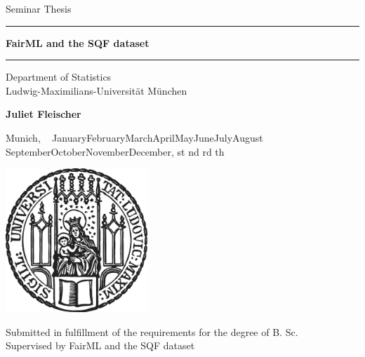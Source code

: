 \documentclass[12pt]{article}
\newcommand{\mytitle}{FairML and the SQF dataset}
\newcommand{\myname}{\large Juliet Fleischer}
\newcommand{\thesuffix}[1]{%
  \ifnum#1=1 st%
  \else\ifnum#1=2 nd%
  \else\ifnum#1=3 rd%
  \else th%
  \fi\fi\fi}
\newcommand{\mydate}{%
  ~\ifcase\month\or
  January\or February\or March\or April\or May\or June\or July\or August\or
  September\or October\or November\or December\fi, \the\day\thesuffix{\day} \number\year}
\begin{document}
 
\begin{titlepage}
\begin{center}
    
\LARGE
Seminar Thesis

\vspace{0.5cm}
      
\rule{\textwidth}{1.5pt}
\LARGE
\textbf{\mytitle}
\rule{\textwidth}{1.5pt}
   
\vspace{0.5cm}
      
\large
Department of Statistics \\
Ludwig-Maximilians-Universität München

\vfill

\Large
\textbf{\myname}

\vfill

\large

Munich, \mydate
      
\vfill

\includegraphics[width = 0.4\textwidth]{../figures/sigillum.png}

\vfill

\normalsize
Submitted in fulfillment of the requirements for the degree of B. Sc.
\\
Supervised by \mytitle

\end{center}
\end{titlepage}


\newpage
\begin{abstract}

In the first half of this paper we provide an introduction to the most common metrics and methods in fair machine learning. We then apply the theoretical concepts to the New York Stop, Question and Frisk dataset, which will showcase difficulties that come with fairness in practice. This leads us to explore the problem of selection bias and related issues. We turn our focus to studies that have worked with the SQF dataset and established interesting theoretical results; residual unfairness, bias reversal and bias inheritance.
Value of this paper: compare and contrast traditional fairness metrics, use them in a real world setting, show its limitations in this setting, present how they are adressed in more advanced ways and try to explain why traditional metrics can not reflect the whole situation.

\end{abstract}
\end{document}
